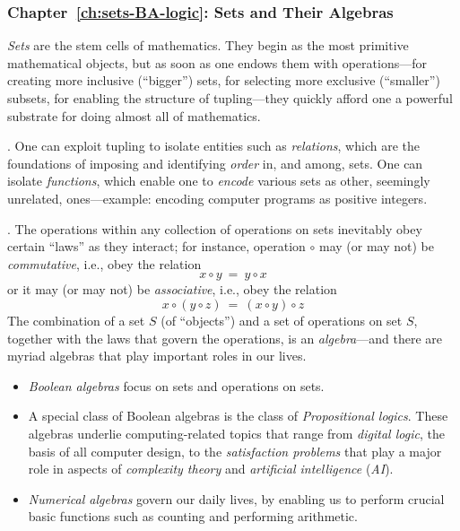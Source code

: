\subsubsection{Chapter~\ref{ch:sets-BA-logic}: Sets and Their Algebras}

{\em Sets} are the stem cells of mathematics.  They begin as the most
primitive mathematical objects, but as soon as one endows them with
operations---for creating more inclusive (``bigger'') sets, for
selecting more exclusive (``smaller'') subsets, for enabling the
structure of tupling---they quickly afford one a powerful substrate
for doing almost all of mathematics.

\medskip

.
%
One can exploit tupling to isolate entities such as {\em relations},
which are the foundations of imposing and identifying {\em order} in,
and among, sets.  One can isolate {\em functions}, which enable one to
{\em encode} various sets as other, seemingly unrelated,
ones---example: encoding computer programs as positive integers.

\medskip

.
%
The operations within any collection of operations on sets inevitably
obey certain ``laws'' as they interact; for instance, operation
$\circ$ may (or may not) be {\em commutative}, i.e., obey the relation
\[ x \circ y \ = \ y \circ x \]
or it may (or may not) be {\em associative}, i.e., obey the relation
\[ x \circ (y \circ z) \ = \ (x \circ y) \circ z \]
The combination of a set $S$ (of ``objects'') and a set of operations
on set $S$, together with the laws that govern the operations, is an
{\em algebra}---and there are myriad algebras that play important
roles in our lives.
\begin{itemize}
\item
{\em Boolean algebras} focus on sets and operations on sets.
\item
A special class of Boolean algebras is the class of {\em Propositional
  logics}.  These algebras underlie computing-related topics that
range from {\em digital logic}, the basis of all computer design, to the
{\em satisfaction problems} that play a major role in aspects of 
{\em complexity theory} and {\em artificial intelligence} ({\em AI}).
\item
{\em Numerical algebras} govern our daily lives, by enabling us to
perform crucial basic functions such as
counting and performing arithmetic.
\end{itemize}


